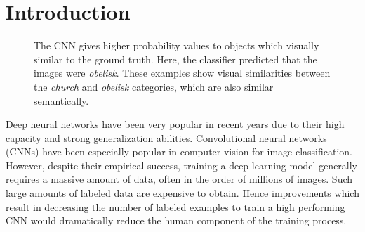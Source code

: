 \section{Introduction}


\begin{figure}[t]
  \centering



  \caption{
    The CNN gives higher probability values to objects which visually similar to
    the ground truth. Here, the classifier predicted that the images were
    \emph{obelisk}. These examples show visual similarities between the
    \emph{church} and \emph{obelisk} categories, which are also similar
    semantically.
  }
  \label{fig:qualitative_results}
\end{figure}


Deep neural networks have been very popular in recent years due to their high
capacity and strong generalization abilities.  Convolutional neural networks
(CNNs) have been especially popular in computer vision for image classification.
However, despite their empirical success, training a deep learning model
generally requires a massive amount of data, often in the order of millions of
images. Such large amounts of labeled data are expensive to obtain. Hence 
improvements which result in decreasing the number of labeled examples to train
a high performing CNN would dramatically reduce the human component of the
training process.

